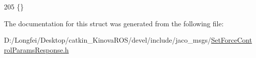 \begin{DoxyCode}
205   \{\}
\end{DoxyCode}


The documentation for this struct was generated from the following file\+:\begin{DoxyCompactItemize}
\item 
D\+:/\+Longfei/\+Desktop/catkin\+\_\+\+Kinova\+R\+O\+S/devel/include/jaco\+\_\+msgs/\hyperlink{SetForceControlParamsResponse_8h}{Set\+Force\+Control\+Params\+Response.\+h}\end{DoxyCompactItemize}
